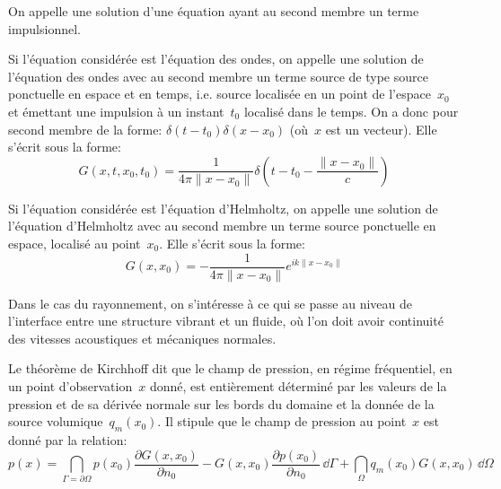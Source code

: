 \begin{definition}
On appelle  une solution d'une équation ayant au
second membre un terme impulsionnel.

Si l'équation considérée est l'équation des ondes, on appelle  une solution de l'équation des ondes avec au second membre un terme source de type source ponctuelle en espace et en temps, i.e. source localisée en un point de l'espace~$x_0$ et émettant une impulsion à un instant~$t_0$ localisé dans le temps. On a donc pour second membre de la forme: $\delta(t-t_0)\delta(x-x_0)$ (où~$x$ est un vecteur).
Elle s'écrit sous la forme:
\begin{equation}
G(x,t,x_0,t_0)=\dfrac{1}{4\pi\|x-x_0\|}\delta\left(t-t_0-\dfrac{\|x-x_0\|}{c}\right)
\end{equation}

Si l'équation considérée est l'équation d'Helmholtz, on appelle  une solution de l'équation d'Helmholtz avec au second membre un terme source ponctuelle en espace, localisé au point~$x_0$.
Elle s'écrit sous la forme:
\begin{equation}
G(x,x_0)=-\dfrac{1}{4\pi\|x-x_0\|}e^{ik\|x-x_0\|}
\end{equation}
\end{definition}

\medskip
Dans le cas du rayonnement, on s'intéresse à ce qui se passe au niveau de l'interface entre une structure vibrant et un fluide, où l'on doit avoir continuité des vitesses acoustiques et mécaniques normales.
\begin{theoreme}
Le théorème de Kirchhoff dit que le champ de pression, en régime fréquentiel, en un point d'observation~$x$ donné, est entièrement déterminé par les valeurs de la pression et de sa dérivée normale sur les bords du domaine et la donnée de la source volumique~$q_m(x_0)$. Il stipule que le champ de pression au point~$x$ est donné par la relation:
\begin{equation}
p(x)=\dint_{\Gamma=\partial\Omega} p(x_0)\dfrac{\partial G(x,x_0)}{\partial n_0} -G(x,x_0)\dfrac{\partial p(x_0)}{\partial n_0}\,\dd\Gamma + \dint_\Omega q_m(x_0)G(x,x_0)\, \dd\Omega
\end{equation}
\end{theoreme}

